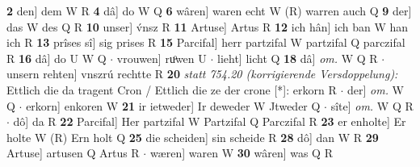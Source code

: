\documentclass[8pt,a4paper,notitlepage]{article}
\begin{document}
\begin{table}[ht]
\begin{minipage}[t]{0.5\linewidth}
\textbf{2} den] dem W R \textbf{4} dâ] do W Q \textbf{6} wâren] waren echt W (R) warren auch Q \textbf{9} der] das W des Q R \textbf{10} unser] v́nsz R \textbf{11} Artuse] Artus R \textbf{12} ich hân] ich ban W han ich R \textbf{13} prîses sî] sig prises R \textbf{15} Parcifal] herr partzifal W partzifal Q parczifal R \textbf{16} dâ] do U W Q  $\cdot$ vrouwen] ruͦwen U  $\cdot$ lieht] licht Q \textbf{18} dâ] \textit{om.} W Q R  $\cdot$ unsern rehten] vnszrú rechtte R \textbf{20} \textit{statt 754.20 (korrigierende Versdoppelung):} Ettlich die da tragent Cron / Ettlich die ze der crone [*]: erkorn R   $\cdot$ der] \textit{om.} W Q  $\cdot$ erkorn] enkoren W \textbf{21} ir ietweder] Ir deweder W Jtweder Q  $\cdot$ sîte] \textit{om.} W Q R  $\cdot$ dô] da R \textbf{22} Parcifal] Her partzifal W Partzifal Q Parczifal R \textbf{23} er enholte] Er holte W (R) Ern holt Q \textbf{25} die scheiden] sin scheide R \textbf{28} dô] dan W R \textbf{29} Artuse] artusen Q Artus R  $\cdot$ wæren] waren W \textbf{30} wâren] was Q R \newline
\end{minipage}
\end{table}
\end{document}
